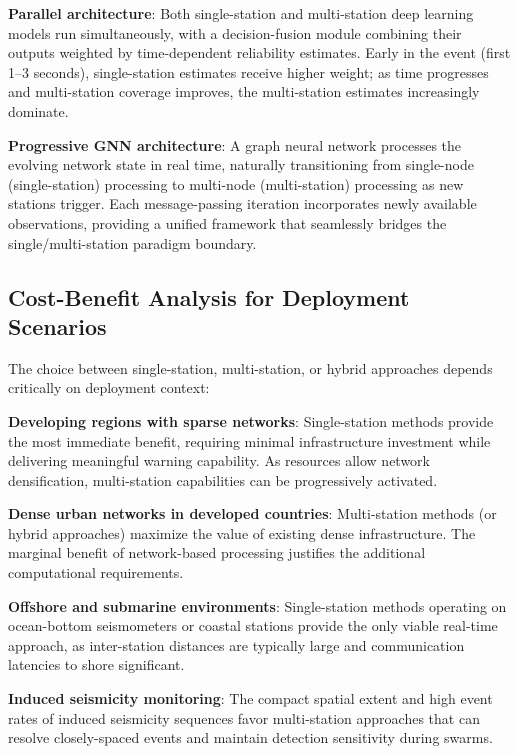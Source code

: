 \documentclass[review,authoryear]{elsarticle}
\begin{document}
\textbf{Parallel architecture}: Both single-station and multi-station deep learning models run simultaneously, with a decision-fusion module combining their outputs weighted by time-dependent reliability estimates. Early in the event (first 1--3 seconds), single-station estimates receive higher weight; as time progresses and multi-station coverage improves, the multi-station estimates increasingly dominate.

\textbf{Progressive GNN architecture}: A graph neural network processes the evolving network state in real time, naturally transitioning from single-node (single-station) processing to multi-node (multi-station) processing as new stations trigger. Each message-passing iteration incorporates newly available observations, providing a unified framework that seamlessly bridges the single/multi-station paradigm boundary.

\subsection{Cost-Benefit Analysis for Deployment Scenarios}

The choice between single-station, multi-station, or hybrid approaches depends critically on deployment context:

\textbf{Developing regions with sparse networks}: Single-station methods provide the most immediate benefit, requiring minimal infrastructure investment while delivering meaningful warning capability. As resources allow network densification, multi-station capabilities can be progressively activated.

\textbf{Dense urban networks in developed countries}: Multi-station methods (or hybrid approaches) maximize the value of existing dense infrastructure. The marginal benefit of network-based processing justifies the additional computational requirements.

\textbf{Offshore and submarine environments}: Single-station methods operating on ocean-bottom seismometers or coastal stations provide the only viable real-time approach, as inter-station distances are typically large and communication latencies to shore significant.

\textbf{Induced seismicity monitoring}: The compact spatial extent and high event rates of induced seismicity sequences favor multi-station approaches that can resolve closely-spaced events and maintain detection sensitivity during swarms.


\end{document}

